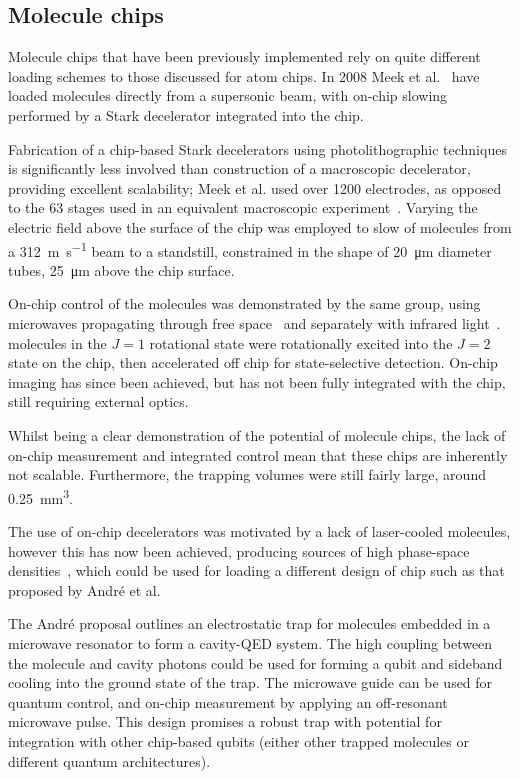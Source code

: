 \subsection{Molecule chips}
\label{litrev:molculechips}


Molecule chips that have been previously implemented rely on quite different
loading schemes to those discussed for atom chips. In 2008 Meek et
al.~\cite{Meek2008} have loaded \CO molecules directly from a supersonic
beam, with on-chip slowing performed by a Stark decelerator integrated into the
chip.

Fabrication of a chip-based Stark decelerators using photolithographic
techniques is significantly less involved than construction of a macroscopic
decelerator, providing excellent scalability; Meek et al. used over 1200
electrodes, as opposed to the 63 stages used in an equivalent macroscopic
experiment~\cite{Bethlem1999}. Varying the electric field above the surface of
the chip was employed to slow of molecules from a \SI{312}{\metre\per\second}
beam to a standstill, constrained in the shape of \SI{20}{\micro\metre} diameter
tubes, \SI{25}{\micro\metre} above the chip surface.~\cite{Meek2009}

On-chip control of the molecules was demonstrated by the same group, using
microwaves propagating through free space~\cite{doi:10.1002/cphc.201001007} and
separately with infrared light~\cite{doi:10.1080/00268976.2012.683885}.  \CO
molecules in the $J=1$ rotational state were rotationally excited into the $J=2$
state on the chip, then accelerated off chip for state-selective detection.
On-chip imaging has since been achieved, but has not been fully integrated with
the chip, still requiring external optics.~\cite{Marx2013}

Whilst being a clear demonstration of the potential of
molecule chips, the lack of on-chip measurement and integrated control mean that
these chips are inherently not scalable.  Furthermore, the trapping volumes were
still fairly large, around \SI{0.25}{\milli\metre\cubed}. 

The use of on-chip decelerators was motivated by a lack of laser-cooled
molecules, however this has now been achieved, producing sources of high
phase-space densities~\cite{Truppe2017}, which could be used for loading a
different design of chip such as that proposed by Andr\'e et
al.~\cite{Andre2006}

The Andr\'e proposal outlines an electrostatic trap for molecules embedded in a
microwave resonator to form a cavity-QED system. The high coupling between the
molecule and cavity photons could be used for forming a qubit and sideband
cooling into the ground state of the trap. The microwave guide can be used for
quantum control, and on-chip measurement by applying an off-resonant microwave
pulse. This design promises a robust trap with potential for integration with
other chip-based qubits (either other trapped molecules or different quantum
architectures).

